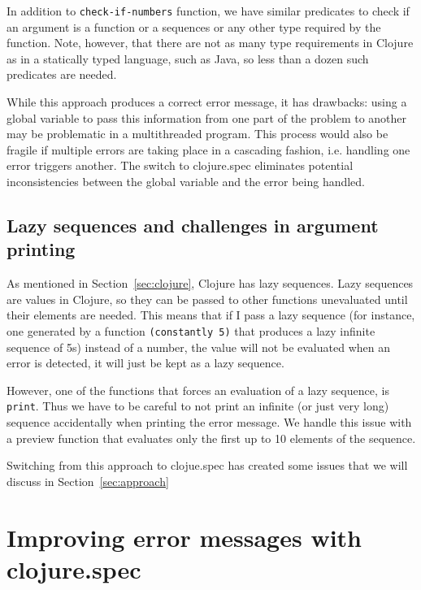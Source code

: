 \documentclass[12pt]{article}
\newcommand{\comment}[1]{{\bf \tt  {#1}}}
\newcommand{\tscomment}[1]{\textcolor{Teal}{\comment{Tony: {#1}}}}
\begin{document}
In addition to {\tt check-if-numbers} function, we have similar predicates to check if an argument is
a function or a sequences or any other type required by the function. Note, however, that there are
not as many type requirements in Clojure as in a statically typed language, such as Java, so less than  
a dozen such predicates are needed. 

While this approach produces a correct error message, it has drawbacks: using a global variable to
pass this information from one part of the problem to another may be problematic in a multithreaded 
program. This process would also be fragile if multiple errors are taking place in a cascading fashion,
i.e. handling one error triggers another. The switch to clojure.spec eliminates potential inconsistencies 
between the global variable and the error being handled. 

\subsection{Lazy sequences and challenges in argument printing}

As mentioned in Section~\ref{sec:clojure}, Clojure has lazy sequences. Lazy sequences are values in 
Clojure, so they can be passed to other functions unevaluated until their elements are needed. 
This means that if I pass a lazy sequence (for instance, one generated by a function {\tt (constantly 5)} that
produces a lazy infinite sequence of 5s) instead of a number, the value will not be evaluated when an 
error is detected, it will just be kept as a lazy sequence. 

However, 
one of the functions that forces an evaluation of  a lazy sequence, is {\tt print}. Thus we have to be careful to not print 
an infinite (or just very long) sequence accidentally when printing the error message. 
We handle this issue with a preview function that evaluates only the first up to 10 elements of the sequence.

Switching from this approach to clojue.spec has created some issues that we will discuss in Section~\ref{sec:approach}


\section{Improving error messages with clojure.spec}\label{sec:spec-errors}
\end{document}
